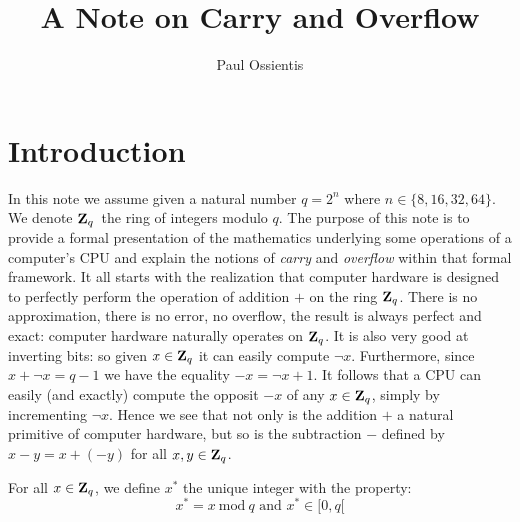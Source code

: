 \documentclass{article}
\title{A Note on Carry and Overflow}
\author{Paul Ossientis}
\newcommand{\zq}{\mbox{${\bf Z}_{q}$}}
\begin{document}
\maketitle

\section{Introduction}
In this note we assume given a natural number $q=2^{n}$ where 
$n\in\{8,16,32,64\}$. We denote \zq\ the ring of integers modulo $q$. 
The purpose of this note is to provide a formal presentation of the mathematics
underlying some operations of a computer's CPU and explain the notions of {\em
carry} and {\em overflow} within that formal framework. It all starts with the
realization that computer hardware is designed to perfectly perform the
operation of addition $+$ on the ring \zq. There is no approximation,
there is no error, no overflow, the result is always perfect and exact: 
computer hardware naturally operates on \zq. It is also very good at 
inverting bits: so given $x\in\zq$ it can easily compute $\lnot x$.
Furthermore, since $x+\lnot x = q-1$ we have the equality $-x = \lnot x + 1$.
It follows that a CPU can easily (and exactly) compute the opposit $-x$ of 
any $x\in\zq$, simply by incrementing $\lnot x$. Hence we see that not only 
is the addition $+$ a natural primitive of computer hardware, but so is
the subtraction $-$ defined by $x-y = x + (-y)$ for all $x,y\in\zq$.

\begin{defin}\label{carry:star} 
  For all $x\in\zq$, we define $x^{*}$ the unique integer with the property:
    \[
      x^{*} = x\ \mbox{mod}\ q\mbox{\ \ and\ \ }x^{*}\in[0,q[
    \]
\end{defin}
\end{document}
